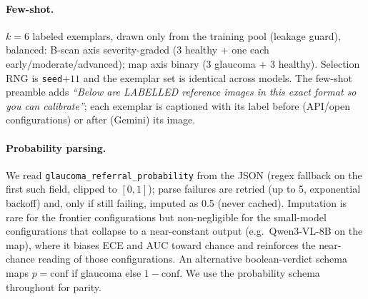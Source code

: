 \paragraph{Few-shot.} $k{=}6$ labeled exemplars, drawn only from the training pool (leakage guard), balanced:
B-scan axis severity-graded (3 healthy + one each early/moderate/advanced); map axis binary (3 glaucoma + 3
healthy). Selection RNG is \texttt{seed}$+11$ and the exemplar set is identical across models. The few-shot preamble
adds \emph{``Below are LABELLED reference images in this exact format so you can calibrate''}; each exemplar is
captioned with its label before (API/open configurations) or after (Gemini) its image.

\paragraph{Probability parsing.} We read \texttt{glaucoma\_referral\_probability} from the JSON (regex fallback on
the first such field, clipped to $[0,1]$); parse failures are retried (up to 5, exponential backoff) and, only if
still failing, imputed as 0.5 (never cached). Imputation is rare for the frontier configurations but non-negligible
for the small-model configurations that collapse to a near-constant output (e.g.\ Qwen3-VL-8B on the map), where it
biases ECE and AUC toward chance and reinforces the near-chance reading of those configurations. An alternative boolean-verdict schema
maps $p{=}\text{conf}$ if glaucoma else $1{-}\text{conf}$. We use the probability schema throughout for parity.

